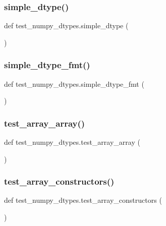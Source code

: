 \subsubsection{\texorpdfstring{simple\_dtype()}{simple\_dtype()}}
{\footnotesize\ttfamily def test\+\_\+numpy\+\_\+dtypes.\+simple\+\_\+dtype (\begin{DoxyParamCaption}{ }\end{DoxyParamCaption})}

\mbox{\label{namespacetest__numpy__dtypes_aae7335e0a95ca71ec61f3ea36ff6bd47}} 
\subsubsection{\texorpdfstring{simple\_dtype\_fmt()}{simple\_dtype\_fmt()}}
{\footnotesize\ttfamily def test\+\_\+numpy\+\_\+dtypes.\+simple\+\_\+dtype\+\_\+fmt (\begin{DoxyParamCaption}{ }\end{DoxyParamCaption})}

\mbox{\label{namespacetest__numpy__dtypes_a3a8fe3a9e3d43b9fb841fa66ac828aaa}} 
\subsubsection{\texorpdfstring{test\_array\_array()}{test\_array\_array()}}
{\footnotesize\ttfamily def test\+\_\+numpy\+\_\+dtypes.\+test\+\_\+array\+\_\+array (\begin{DoxyParamCaption}{ }\end{DoxyParamCaption})}

\mbox{\label{namespacetest__numpy__dtypes_ada5a065bb22cb3390833d04b26ae7061}} 
\subsubsection{\texorpdfstring{test\_array\_constructors()}{test\_array\_constructors()}}
{\footnotesize\ttfamily def test\+\_\+numpy\+\_\+dtypes.\+test\+\_\+array\+\_\+constructors (\begin{DoxyParamCaption}{ }\end{DoxyParamCaption})}

